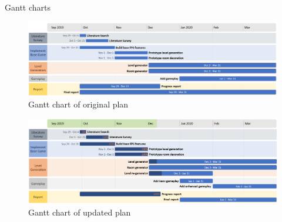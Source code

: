 \documentclass[progress]{cmpreport}
\begin{document}


\newpage

\appendix

\begin{section}{Gantt charts}

\begin{figure}[H]
    \includegraphics[width=\textwidth,height=0.9\textheight,keepaspectratio]{img/gantt-original.png}
    \caption{Gantt chart of original plan}
    \label{fig:gantt1}
\end{figure}

\begin{figure}[H]
    \includegraphics[width=\textwidth,height=0.9\textheight,keepaspectratio]{img/gantt-updated.png}
    \caption{Gantt chart of updated plan}
    \label{fig:gantt2}
\end{figure}

\end{section}
\end{document}
